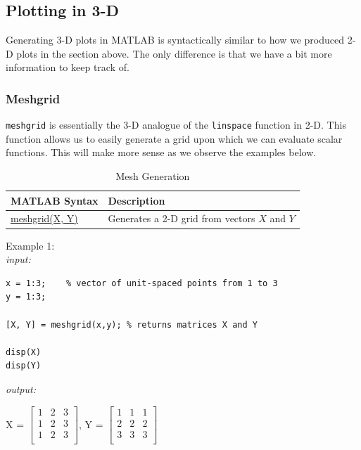 \documentclass[../MATLAB_Primer.tex]{subfiles}
\begin{document}
\subsection{Plotting in 3-D}
Generating 3-D plots in MATLAB is syntactically similar to how we produced 2-D plots in the section above.  The only difference is that we have a bit more information to keep track of. 
\subsubsection{Meshgrid}
\texttt{meshgrid} is essentially the 3-D analogue of the \texttt{linspace} function in 2-D.  This function allows us to easily generate a grid upon which we can evaluate scalar functions.  This will make more sense as we observe the examples below. 

\begin{table}[H]
\caption{Mesh Generation}
    \begin{center}
        \begin{tabular}{| C{3cm} | m{12cm}|}
            \hline
            \textbf{MATLAB Syntax} & \textbf{Description}\\
            
            \hline
            \href{https://www.mathworks.com/help/matlab/ref/meshgrid.html}{\color{blue}meshgrid(X, Y)} & Generates a 2-D grid from vectors $X$ and $Y$ \\
            \hline
        \end{tabular}
        \label{tab:mesh}
    \end{center}
\end{table}

Example 1:\\

\textit{input:}
\begin{lstlisting}
x = 1:3;    % vector of unit-spaced points from 1 to 3
y = 1:3;

[X, Y] = meshgrid(x,y); % returns matrices X and Y

disp(X)
disp(Y)
\end{lstlisting}
\textit{output:}
\begin{center}
    X = 
    $\begin{bmatrix}
    1 & 2 & 3\\
    1 & 2 & 3\\
    1 & 2 & 3\\
    \end{bmatrix}$,\quad 
    Y = 
    $\begin{bmatrix}
    1 & 1 & 1\\
    2 & 2 & 2\\
    3 & 3 & 3\\
    \end{bmatrix}$
\end{center}
\end{document}
